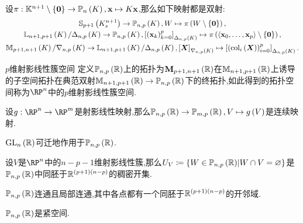 \begin{proposition}{}{}
	设$\pi:\mathbb{K}^{n+1}\setminus\left\{\mathbf{0}\right\}\to\mathbb{P}_{n}\left(K\right),\mathbf{x}\mapsto K\mathbf{x}$,那么如下映射都是双射:
	\begin{gather*}
		\mathbb{S}_{p+1}\left(K_{s}^{n+1}\right)\to\mathbb{P}_{n,p}\left(K\right),
		W\mapsto\pi\left(W\setminus\left\{\mathbf{0}\right\}\right),\\
		\mathbb{L}_{n+1,p+1}\left(K\right)/\Delta_{n,p}\left(K\right)\to\mathbb{P}_{n,p}\left(K\right),
		\left[\left(\mathbf{x}_{k}\right)_{k=0}^{p}\right]_{\Delta_{n,p}\left(K\right)}
		\mapsto
		\pi\left(\langle\mathbf{x}_{0},\ldots,\mathbf{x}_{p}\rangle\setminus\left\{\mathbf{0}\right\}\right),\\
		\mathbb{M}_{p+1,n+1}\left(K\right)/\nabla_{n,p}\left(K\right)\to\mathbb{L}_{n+1,p+1}\left(K\right)/\Delta_{n,p}\left(K\right),
		\left[\bm{X}\right]_{\nabla_{n,p}\left(K\right)}
		\mapsto
		\left[\left(\operatorname{col}_{i}\left(\bm{X}\right)\right)_{i=0}^{p}\right]_{\Delta_{n,p}\left(K\right)}.
	\end{gather*}
\end{proposition}

\begin{definition}{$p$维射影线性簇空间}{}
	定义$\mathbb{P}_{n,p}\left(\mathbb{R}\right)$上的拓扑为$\mathbf{M}_{p+1,n+1}\left(\mathbb{R}\right)$在$\mathbb{M}_{n+1,p+1}\left(\mathbb{R}\right)$上诱导的子空间拓扑在典范双射$\mathbb{M}_{n+1,p+1}\left(\mathbb{R}\right)\to\mathbb{P}_{n,p}\left(\mathbb{R}\right)$下的终拓扑,如此得到的拓扑空间称为$\RP^{n}$中的$p$维射影线性簇空间.
\end{definition}

\begin{proposition}{}{}
	设$g:\RP^{n}\to\RP^{m}$是射影线性映射,那么$\mathbb{P}_{n,p}\left(\mathbb{R}\right)\to\mathbb{P}_{m,p}\left(\mathbb{R}\right),V\mapsto g\left(V\right)$是连续映射.
\end{proposition}

\begin{corollary}{}{}
	$\operatorname{GL}_{n}\left(\mathbb{R}\right)$可迁地作用于$\mathbb{P}_{n,p}\left(\mathbb{R}\right)$.
\end{corollary}

\begin{proposition}{}{}
	设$V$是$\RP^{n}$中的$n-p-1$维射影线性簇,那么$U_{V}\coloneq\left\{W\in\mathbb{P}_{n,p}\left(\mathbb{R}\right)\middle|W\cap V=\varnothing\right\}$是$\mathbb{P}_{n,p}\left(\mathbb{R}\right)$中同胚于$\mathbb{R}^{\left(p+1\right)\left(n-p\right)}$的稠密开集.
\end{proposition}

\begin{corollary}{}{}
	$\mathbb{P}_{n,p}\left(\mathbb{R}\right)$连通且局部连通,其中各点都有一个同胚于$\mathbb{R}^{\left(p+1\right)\left(n-p\right)}$的开邻域.
\end{corollary}

\begin{proposition}{}{}
	$\mathbb{P}_{n,p}\left(\mathbb{R}\right)$是紧空间.
\end{proposition}

